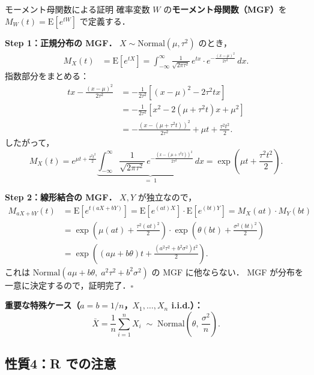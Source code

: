 \documentclass[lualatex,ja=standard,a4paper,12pt]{bxjsarticle}
\begin{document}
\begin{derivbox}{モーメント母関数による証明}
確率変数 $W$ の\textbf{モーメント母関数（MGF）}を $M_W(t) = \mathrm{E}[e^{tW}]$ で定義する．

\medskip
\noindent\textbf{Step 1：正規分布の MGF．}
$X \sim \mathrm{Normal}(\mu, \tau^2)$ のとき，
\begin{align*}
  M_X(t)
  &= \mathrm{E}[e^{tX}]
   = \int_{-\infty}^{\infty}
       \frac{1}{\sqrt{2\pi\tau^2}}\,
       e^{tx} \cdot e^{-\frac{(x-\mu)^2}{2\tau^2}}\,dx.
\end{align*}
指数部分をまとめる：
\begin{align*}
  tx - \frac{(x-\mu)^2}{2\tau^2}
  &= -\frac{1}{2\tau^2}\left[(x-\mu)^2 - 2\tau^2 tx\right] \\
  &= -\frac{1}{2\tau^2}\left[x^2 - 2(\mu + \tau^2 t)x + \mu^2\right] \\
  &= -\frac{(x - (\mu + \tau^2 t))^2}{2\tau^2} + \mu t + \frac{\tau^2 t^2}{2}.
\end{align*}
したがって，
\[
  M_X(t)
  = e^{\mu t + \frac{\tau^2 t^2}{2}}
    \underbrace{
      \int_{-\infty}^{\infty} \frac{1}{\sqrt{2\pi\tau^2}}\,
      e^{-\frac{(x-(\mu+\tau^2 t))^2}{2\tau^2}}\,dx
    }_{=\;1}
  = \exp\!\left(\mu t + \frac{\tau^2 t^2}{2}\right).
\]

\medskip
\noindent\textbf{Step 2：線形結合の MGF．}
$X, Y$ が独立なので，
\begin{align*}
  M_{aX+bY}(t)
  &= \mathrm{E}[e^{t(aX+bY)}]
   = \mathrm{E}[e^{(at)X}] \cdot \mathrm{E}[e^{(bt)Y}]
   = M_X(at) \cdot M_Y(bt) \\
  &= \exp\!\left(\mu(at) + \frac{\tau^2(at)^2}{2}\right)
     \cdot
     \exp\!\left(\theta(bt) + \frac{\sigma^2(bt)^2}{2}\right) \\
  &= \exp\!\left((a\mu + b\theta)t + \frac{(a^2\tau^2 + b^2\sigma^2)t^2}{2}\right).
\end{align*}
これは $\mathrm{Normal}(a\mu + b\theta,\; a^2\tau^2 + b^2\sigma^2)$ の MGF に他ならない．
MGF が分布を一意に決定するので，証明完了．\hfill $\square$

\medskip
\noindent\textbf{重要な特殊ケース（$a = b = 1/n$，$X_1, \ldots, X_n$ i.i.d.）：}
\[
  \bar{X} = \frac{1}{n}\sum_{i=1}^n X_i
  \;\sim\; \mathrm{Normal}\!\left(\theta,\, \frac{\sigma^2}{n}\right).
\]
\end{derivbox}

\subsection{性質4：R での注意}
\end{document}
